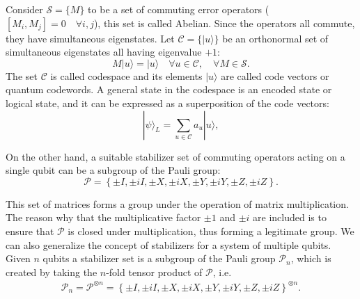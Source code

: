 



Consider $\mathcal{S}=\{M\}$ to be a set of commuting error operators ($[M_i,M_j]=0 \quad \forall i,j$), this set is called Abelian. Since the operators all commute, they  have simultaneous eigenstates.
Let $\mathcal{C}=\{|u\rangle\}$ be an orthonormal set of simultaneous eigenstates all having eigenvalue $+1$:
\begin{equation}
M|u\rangle=|u\rangle \quad \forall u \in \mathcal{C}, \quad \forall M \in \mathcal{S}.
\label{eq:stab}
\end{equation}
The set $\mathcal{C}$ is called codespace and its elements $|u\rangle$ are called code vectors or quantum codewords. 
A general state in the codespace is an encoded state or logical state, and it can be expressed as a superposition of the code vectors:
$$
|\psi\rangle_{L}=\sum_{u \in \mathcal{C}} a_{u}|u\rangle,
$$ 

On the other hand, a suitable stabilizer set of commuting operators acting on a single qubit can be a subgroup of the Pauli group:
$$
\mathcal{P}=\left\{\pm I, \pm i I, \pm X, \pm i X, \pm Y, \pm i Y, \pm Z, \pm i Z\right\}.
$$

This set of matrices forms a group under the operation of matrix multiplication. The reason why that the multiplicative factor $\pm 1 $ and $\pm i$ are included is to ensure that $\mathcal{P}$ is closed under multiplication, thus forming a legitimate group. 
We can also generalize the concept of stabilizers for a system of multiple qubits. 
Given $n$ qubits a stabilizer set is a subgroup of the Pauli group $\mathcal{P}_n$, which is created by taking the $n$-fold tensor product of $\mathcal{P}$, i.e.
$$
\begin{aligned}
\mathcal{P}_{n} =\mathcal{P}^{\otimes n}
=\left\{\pm I, \pm i I, \pm X, \pm i X, \pm Y, \pm i Y, \pm Z, \pm i Z\right\}^{\otimes n}.
\end{aligned}
$$

